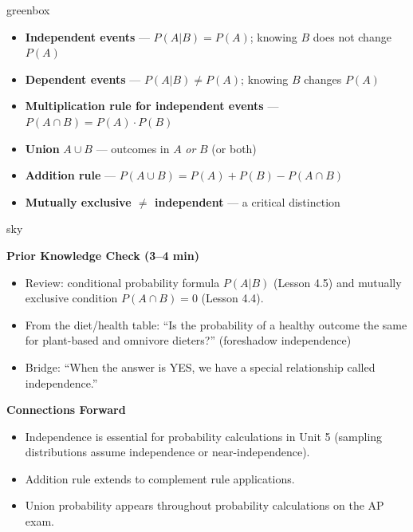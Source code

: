 \documentclass[10pt]{article}
\begin{document}
\begin{skillbox}{greenbox}
\begin{minipage}[t]{0.48\linewidth}
    \begin{itemize}
        \item \textbf{Independent events} --- $P(A|B) = P(A)$; knowing $B$ does not change $P(A)$
        \item \textbf{Dependent events} --- $P(A|B) \neq P(A)$; knowing $B$ changes $P(A)$
        \item \textbf{Multiplication rule for independent events} --- $P(A \cap B) = P(A) \cdot P(B)$
    \end{itemize}
\end{minipage}
\hfill
\begin{minipage}[t]{0.48\linewidth}
    \begin{itemize}
        \item \textbf{Union} $A \cup B$ --- outcomes in $A$ \emph{or} $B$ (or both)
        \item \textbf{Addition rule} --- $P(A \cup B) = P(A) + P(B) - P(A \cap B)$
        \item \textbf{Mutually exclusive $\neq$ independent} --- a critical distinction
    \end{itemize}
\end{minipage}
\end{skillbox}

\begin{skillbox}{sky}
\begin{minipage}[t]{0.48\linewidth}
    \textbf{Prior Knowledge Check (3--4 min)}
    \begin{itemize}
        \item Review: conditional probability formula $P(A|B)$ (Lesson 4.5) and
              mutually exclusive condition $P(A \cap B) = 0$ (Lesson 4.4).
        \item From the diet/health table: ``Is the probability of a healthy outcome
              the same for plant-based and omnivore dieters?'' (foreshadow independence)
        \item Bridge: ``When the answer is YES, we have a special relationship
              called independence.''
    \end{itemize}
\end{minipage}
\hfill
\begin{minipage}[t]{0.48\linewidth}
    \textbf{Connections Forward}
    \begin{itemize}
        \item Independence is essential for probability calculations in Unit 5
              (sampling distributions assume independence or near-independence).
        \item Addition rule extends to complement rule applications.
        \item Union probability appears throughout probability calculations on the AP exam.
    \end{itemize}
\end{minipage}
\end{skillbox}
\end{document}
